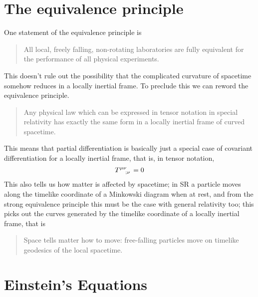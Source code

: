 \section{The equivalence principle}
\label{sec:equiv-princ}

One statement of the equivalence principle is
\begin{quotation}
  All local, freely falling, non-rotating laboratories are fully
  equivalent for the performance of all physical experiments.
\end{quotation}
This doesn't rule out the possibility that the complicated curvature
of spacetime somehow reduces in a locally inertial frame. To preclude
this we can reword the equivalence principle.
\begin{quotation}
  Any physical law which can be expressed in tensor notation in
  special relativity has exactly the same form in a locally inertial
  frame of curved spacetime.
\end{quotation}
This means that partial differentiation is basically just a special
case of covariant differentiation for a locally inertial frame, that
is, in tensor notation,
\begin{equation}
  \label{eq:96}
  \tensor{T}{^{\mu \nu}_{;\nu}} = 0
\end{equation}
This also tells us how matter is affected by spacetime; in SR a
particle moves along the timelike coordinate of a Minkowski diagram
when at rest, and from the strong equivalence principle this must be
the case with general relativity too; this picks out the curves
generated by the timelike coordinate of a locally inertial frame, that
is
\begin{quotation}
  Space tells matter how to move: free-falling particles move on
  timelike geodesics of the local spacetime.
\end{quotation}



\section{Einstein's Equations}
\label{sec:einsteins-equations}

